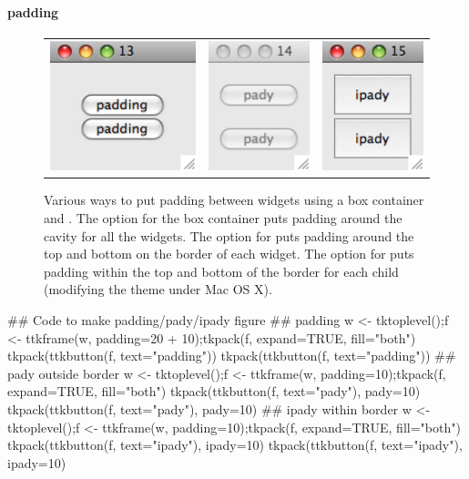 \paragraph{padding}

\begin{figure}
  \centering
  \begin{tabular}[c@{\quad}c@{\quad}]{ccc}
    \includegraphics[width=.25\textwidth]{fig-pack-padding} &
    \includegraphics[width=.25\textwidth]{fig-pack-pady} &
    \includegraphics[width=.25\textwidth]{fig-pack-ipady}
  \end{tabular}
  \caption{Various ways to put padding between widgets using a box container and . The  option for the box container puts padding around the cavity for all the widgets. The  option for  puts padding around the top and bottom on the border of each widget. The  option for  puts padding within the top and bottom of the border for each child (modifying the theme under Mac OS X).}
  \label{fig:fig-pack-example}
\end{figure}

\begin{Schunk}
\begin{Sinput}
 ## Code to make padding/pady/ipady figure
 ## padding
 w <- tktoplevel();f <- ttkframe(w, padding=20 + 10);tkpack(f, expand=TRUE, fill="both")
 tkpack(ttkbutton(f, text="padding"))
 tkpack(ttkbutton(f, text="padding"))
 ##  pady outside border
 w <- tktoplevel();f <- ttkframe(w, padding=10);tkpack(f, expand=TRUE, fill="both")
 tkpack(ttkbutton(f, text="pady"), pady=10)
 tkpack(ttkbutton(f, text="pady"), pady=10)
 ## ipady within border
 w <- tktoplevel();f <- ttkframe(w, padding=10);tkpack(f, expand=TRUE, fill="both")
 tkpack(ttkbutton(f, text="ipady"), ipady=10)
 tkpack(ttkbutton(f, text="ipady"), ipady=10)
\end{Sinput}
\end{Schunk}

